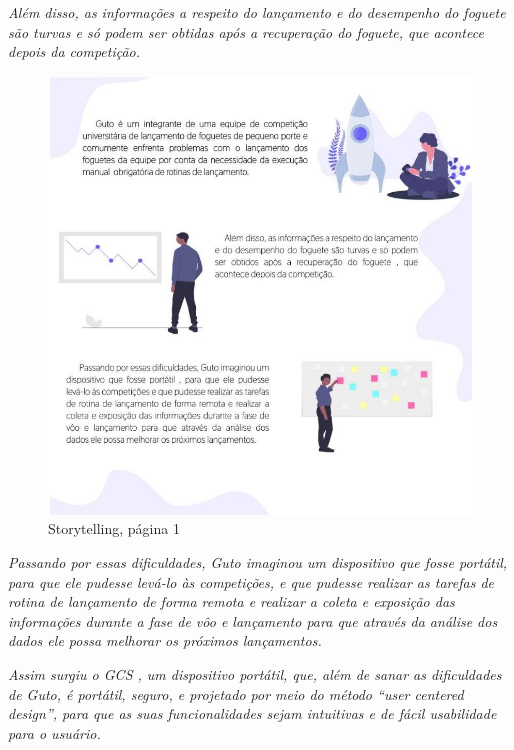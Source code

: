 \textit{Além disso, as informações a respeito do lançamento e do desempenho do foguete são turvas e só podem ser obtidas após a recuperação do foguete, que acontece depois da competição.}

\begin{figure}[H]
\centering
\includegraphics[width=1\textwidth]{figuras/storytelling1.jpg}
\caption{Storytelling, página 1}
\label{fig:storytelling}
\end{figure}

\textit{Passando por essas dificuldades, Guto imaginou um dispositivo que fosse portátil, para que ele pudesse levá-lo às competições, e que pudesse realizar as tarefas de rotina de lançamento de forma remota e realizar a coleta e exposição das informações durante a fase de vôo e lançamento para que através da análise dos dados ele possa melhorar os próximos lançamentos.}

\textit{Assim surgiu o  GCS , um dispositivo portátil, que, além de sanar as dificuldades de Guto, é portátil, seguro, e projetado por meio do método “user centered design”, para que as suas funcionalidades sejam intuitivas e de fácil usabilidade para o usuário.}

